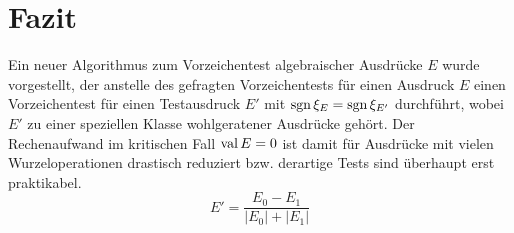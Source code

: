 %
%
\vfill
\section{Fazit}

Ein neuer Algorithmus zum Vorzeichentest 
algebraischer Ausdrücke $E$ wurde vorgestellt,
der anstelle des gefragten Vorzeichentests
für einen Ausdruck $E$ einen Vorzeichentest
für einen Testausdruck $E'$ mit $\operatorname{sgn}\xi_E=\operatorname{sgn}\xi_{E'}$
durchführt, wobei $E'$ zu einer speziellen Klasse
wohlgeratener Ausdrücke gehört.
Der Rechenaufwand im kritischen Fall $\mathop{\rm val}\nolimits E=0$ ist damit
für Ausdrücke mit vielen Wurzeloperationen 
drastisch reduziert 
bzw. derartige Tests sind überhaupt erst praktikabel.
\vfill
$$E' = \frac{E_0-E_1}{|E_0|+|E_1|}$$
\vfill

%
%
